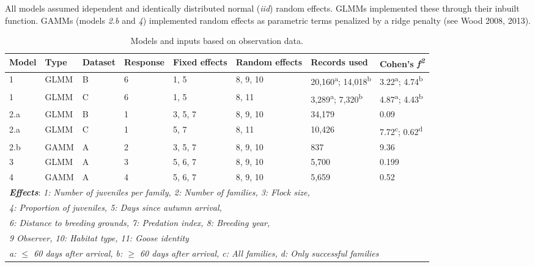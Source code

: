 \documentclass[10pt,twocolumn]{paper}
\begin{document}
All models assumed idependent and identically distributed normal
(\emph{iid}) random effects. GLMMs implemented these through their
inbuilt function. GAMMs (models \emph{2.b} and \emph{4}) implemented
random effects as parametric terms penalized by a ridge penalty (see
Wood 2008, 2013).

\begin{table}[H]
\begin{tabular}{l*7l}
\toprule
Model & Type & Dataset & Response & Fixed effects & Random effects & Records used & Cohen's \emph{f\textsuperscript{2}}\\
\midrule
1 & GLMM & B & 6 & 1, 5 & 8, 9, 10 & 20,160\textsuperscript{a}; 14,018\textsuperscript{b} & 3.22\textsuperscript{a}; 4.74\textsuperscript{b}\\

1 & GLMM & C & 6 & 1, 5 & 8, 11 & 3,289\textsuperscript{a}; 7,320\textsuperscript{b} & 4.87\textsuperscript{a}; 4.43\textsuperscript{b}\\

2.a & GLMM & B & 1 & 3, 5, 7 & 8, 9, 10 & 34,179 & 0.09\\

2.a & GLMM & C & 1 & 5, 7 & 8, 11 & 10,426 & 7.72\textsuperscript{c}; 0.62\textsuperscript{d} \\

2.b & GAMM & A & 2 & 3, 5, 7 & 8, 9, 10 & 837 & 9.36\\

3 & GLMM & A & 3 & 5, 6, 7 & 8, 9, 10 & 5,700 & 0.199\\

4 & GAMM & A & 4 & 5, 6, 7 & 8, 9, 10 & 5,659 & 0.52\\\midrule

\multicolumn{8}{l}{\textbf{\emph{Effects}}: \emph{1: Number of juveniles per family, 2: Number of families, 3: Flock size,}} \\
\multicolumn{8}{l}{\emph{4: Proportion of juveniles, 5: Days since autumn arrival,}} \\
\multicolumn{8}{l}{\emph{6: Distance to breeding grounds, 7: Predation index, 8: Breeding year,}} \\
\multicolumn{8}{l}{\emph{9 Observer, 10: Habitat type, 11: Goose identity}} \\
\midrule
\multicolumn{8}{l}{\emph{a: \ensuremath{\le} 60 days after arrival, b: \ensuremath{\ge} 60 days after arrival, c: All families, d: Only successful families}} \\
\bottomrule
\end{tabular}
\caption{Models and inputs based on observation data.}
\end{table}
\end{document}
